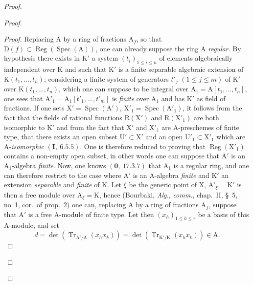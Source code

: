 \begin{proof}
\begin{proof}
\begin{proof}
Replacing $\mathrm{A}$ by a ring of fractions $\mathrm{A}_f$, so that $\mathrm{D}(f)\subset\operatorname{Reg}(\operatorname{Spec}(\mathrm{A}))$,
one can already suppose the ring $\mathrm{A}$ \emph{regular}. By hypothesis there exists in $\mathrm{K}'$ a system
$(t_i)_{1\leqslant i\leqslant n}$ of elements algebraically independent over $\mathrm{K}$ and such that $\mathrm{K}'$ is a
finite separable algebraic extension of $\mathrm{K}(t_1,\ldots,t_n)$; considering a finite system
of generators $t'_j$ $(1\leqslant j\leqslant m)$ of $\mathrm{K}'$ over $\mathrm{K}(t_1,\ldots,t_n)$, which one can suppose to be integral
over $\mathrm{A}_1=\mathrm{A}[t_1,\ldots,t_n]$, one sees that $\mathrm{A}'_1=\mathrm{A}_1[t'_1,\ldots,t'_m]$ is \emph{finite} over $\mathrm{A}_1$ and has $\mathrm{K}'$ as
field of fractions. If one sets $\mathrm{X}'=\operatorname{Spec}(\mathrm{A}')$, $\mathrm{X}'_1=\operatorname{Spec}(\mathrm{A}'_1)$, it follows from the fact that the fields
of rational functions $\mathrm{R}(\mathrm{X}')$ and $\mathrm{R}(\mathrm{X}'_1)$ are both isomorphic to $\mathrm{K}'$ and from the fact that $\mathrm{X}'$
and $\mathrm{X}'_1$ are $\mathrm{A}$-preschemes of finite type, that there exists an open subset $\mathrm{U}'\subset\mathrm{X}'$ and an open
$\mathrm{U}'_1\subset\mathrm{X}'_1$ which are $\mathrm{A}$-\emph{isomorphic} $(\mathbf{I},~6.5.5)$. One is therefore reduced to proving that $\operatorname{Reg}(\mathrm{X}'_1)$
contains a non-empty open subset, in other words one can suppose that $\mathrm{A}'$ is an $\mathrm{A}_1$-algebra
\emph{finite}. Now, one knows $(\mathbf{0},~17.3.7)$ that $\mathrm{A}_1$ is a regular ring, and one can therefore restrict to the
case where $\mathrm{A}'$ is an $\mathrm{A}$-algebra \emph{finite} and $\mathrm{K}'$ an extension \emph{separable} and \emph{finite} of $\mathrm{K}$. Let $\xi$ be the
generic point of $\mathrm{X}$, $\mathrm{A}'_\xi=\mathrm{K}'$ is then a free module over $\mathrm{A}_\xi=\mathrm{K}$, hence (Bourbaki, \emph{Alg.},
\emph{comm.}, chap.~II, \S~5, no~1, cor.\ of prop.~2) one can, replacing $\mathrm{A}$ by a ring of fractions $\mathrm{A}_f$,
suppose that $\mathrm{A}'$ is a free $\mathrm{A}$-module of finite type. Let then $(x_h)_{1\leqslant h\leqslant r}$ be a basis of
this $\mathrm{A}$-module, and set
\[
  d=\det(\operatorname{Tr}_{\mathrm{A}'/\mathrm{A}}(x_h x_k))=\det(\operatorname{Tr}_{\mathrm{K}'/\mathrm{K}}(x_h x_k))\in\mathrm{A}.
\]


\end{proof}
\end{proof}
\end{proof}
